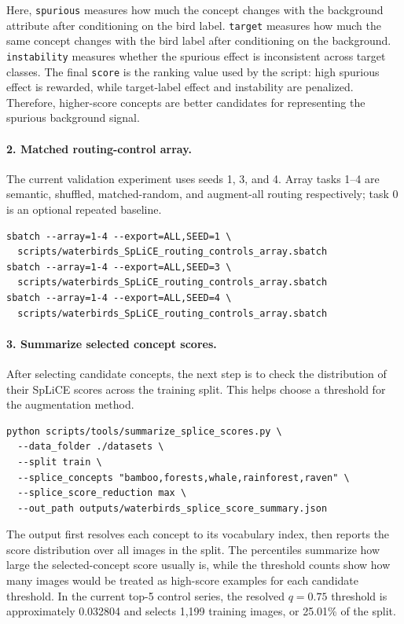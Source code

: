 \documentclass[11pt,a4paper]{article}
\begin{document}
Here, \texttt{spurious} measures how much the concept changes with the
background attribute after conditioning on the bird label. \texttt{target}
measures how much the same concept changes with the bird label after
conditioning on the background. \texttt{instability} measures whether the
spurious effect is inconsistent across target classes. The final
\texttt{score} is the ranking value used by the script: high spurious effect is
rewarded, while target-label effect and instability are penalized. Therefore,
higher-score concepts are better candidates for representing the spurious
background signal.

\paragraph{2. Matched routing-control array.}
The current validation experiment uses seeds 1, 3, and 4. Array tasks 1--4 are
semantic, shuffled, matched-random, and augment-all routing respectively; task
0 is an optional repeated baseline.

\begin{verbatim}
sbatch --array=1-4 --export=ALL,SEED=1 \
  scripts/waterbirds_SpLiCE_routing_controls_array.sbatch
sbatch --array=1-4 --export=ALL,SEED=3 \
  scripts/waterbirds_SpLiCE_routing_controls_array.sbatch
sbatch --array=1-4 --export=ALL,SEED=4 \
  scripts/waterbirds_SpLiCE_routing_controls_array.sbatch
\end{verbatim}

\paragraph{3. Summarize selected concept scores.}
After selecting candidate concepts, the next step is to check the distribution
of their SpLiCE scores across the training split. This helps choose a threshold
for the augmentation method.

\begin{verbatim}
python scripts/tools/summarize_splice_scores.py \
  --data_folder ./datasets \
  --split train \
  --splice_concepts "bamboo,forests,whale,rainforest,raven" \
  --splice_score_reduction max \
  --out_path outputs/waterbirds_splice_score_summary.json
\end{verbatim}

The output first resolves each concept to its vocabulary index, then reports the
score distribution over all images in the split. The percentiles summarize how
large the selected-concept score usually is, while the threshold counts show how
many images would be treated as high-score examples for each candidate
threshold. In the current top-5 control series, the resolved $q=0.75$ threshold
is approximately 0.032804 and selects 1,199 training images, or 25.01\% of the
split.
\end{document}
